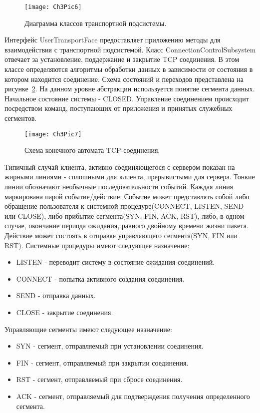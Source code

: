     \begin{figure}[h!]\center
        \texttt{[image: Ch3Pic6]}
        \caption{Диаграмма классов транспортной подсистемы. } \label{Pic6}
    \end{figure}

    Интерфейс UserTransportFace предоставляет приложению методы для взаимодействия с транспортной подсистемой. Класс ConnectionControlSubsystem отвечает за установление, поддержание и закрытие TCP соединения. В этом классе определяются алгоритмы обработки данных в зависимости от состояния в котором находится соединение. Схема состояний и переходов представлена на рисунке~\ref{Pic7}. На данном уровне абстракции используется понятие сегмента данных. Начальное состояние системы - CLOSED. Управление соединением происходит посредством команд, поступающих от приложения и принятых служебных сегментов.



    \begin{figure}[h!]\center
        \texttt{[image: Ch3Pic7]}
        \caption{Схема конечного автомата TCP-соединения. } \label{Pic7}
    \end{figure}


    Типичный случай клиента, активно соединяющегося с сервером показан на жирными линиями - сплошными для клиента, прерывистыми для сервера. Тонкие линии обозначают необычные последовательности событий. Каждая линия маркирована парой событие/действие. Событие может представлять собой либо обращение пользователя к системной процедуре(CONNECT, LISTEN, SEND или CLOSE), либо прибытие сегмента(SYN, FIN, ACK, RST), либо, в одном случае, окончание периода ожидания, равного двойному времени жизни пакета. Действие может состоять в отправке управляющего сегмента(SYN, FIN или RST). Системные процедуры имеют следующее назначение:
    \begin{itemize}
        \item LISTEN - переводит систему в состояние ожидания соединений.
        \item CONNECT - попытка активного создания соединения.
        \item SEND - отправка данных.
        \item CLOSE - закрытие соединения.
    \end{itemize}

    Управляющие сегменты имеют следующее назначение:

    \begin{itemize}
        \item SYN - сегмент, отправляемый при установлении соединения.
        \item FIN - сегмент, отправляемый при закрытии соединения.
        \item RST - сегмент, отправляемый при сбросе соединения.
        \item ACK - сегмент, отправляемый для подтверждения получения определенного сегмента.
    \end{itemize}


